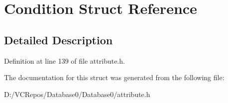 \hypertarget{struct_condition}{}\section{Condition Struct Reference}
\label{struct_condition}


\subsection{Detailed Description}


Definition at line 139 of file attribute.\+h.



The documentation for this struct was generated from the following file\+:\begin{DoxyCompactItemize}
\item 
D\+:/\+V\+C\+Repos/\+Database0/\+Database0/attribute.\+h\end{DoxyCompactItemize}
